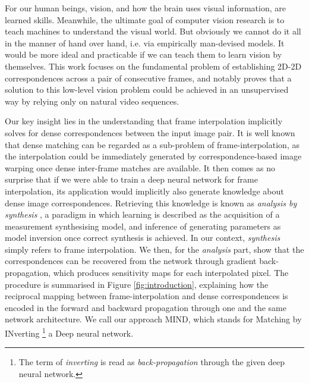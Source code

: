 \documentclass[runningheads]{llncs}
\begin{document}
  For our human beings, vision, and how the brain uses visual information, are learned skills. Meanwhile, the ultimate goal of computer vision research is to teach machines to understand the visual world. But obviously we cannot do it all in the manner of hand over hand, i.e. via empirically man-devised models. It would be more ideal and practicable if we can teach them to learn vision by themselves. This work focuses on the fundamental problem of establishing 2D-2D correspondences across a pair of consecutive frames, and notably proves that a solution to this low-level vision problem could be achieved in an unsupervised way by relying only on natural video sequences. 
  
  Our key insight lies in the understanding that frame interpolation implicitly solves for dense correspondences between the input image pair. It is well known that dense matching can be regarded as a sub-problem of frame-interpolation, as the interpolation could be immediately generated by correspondence-based image warping once dense inter-frame matches are available. It then comes as no surprise that if we were able to train a deep neural network for frame interpolation, its application would implicitly also generate knowledge about dense image correspondences. Retrieving this knowledge is known as \textit{analysis by synthesis} \cite{yildirim15}, a paradigm in which learning is described as the acquisition of a measurement synthesising model, and inference of generating parameters as model inversion once correct synthesis is achieved. In our context, \textit{synthesis} simply refers to frame interpolation. We then, for the \textit{analysis} part, show that the correspondences can be recovered from the network through gradient back-propagation, which produces sensitivity maps for each interpolated pixel. The procedure is summarised in Figure \ref{fig:introduction}, explaining how the reciprocal mapping between frame-interpolation and dense correspondences is encoded in the forward and backward propagation through one and the same network architecture. We call our approach MIND, which stands for Matching by INverting \footnote{The term of \textit{inverting} is read as \textit{back-propagation} through the given deep neural network.} a Deep neural network.
    
\end{document}
